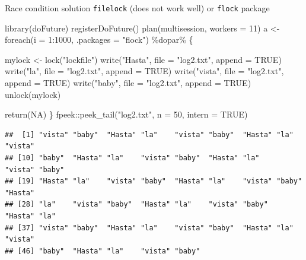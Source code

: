 \documentclass[
  ignorenonframetext,
  usenames,
  dvipsnames]{beamer}
\newenvironment{Shaded}{\begin{snugshade}}{\end{snugshade}}
\newcommand{\AttributeTok}[1]{\textcolor[rgb]{0.77,0.63,0.00}{#1}}
\newcommand{\ConstantTok}[1]{\textcolor[rgb]{0.00,0.00,0.00}{#1}}
\newcommand{\DecValTok}[1]{\textcolor[rgb]{0.00,0.00,0.81}{#1}}
\newcommand{\FunctionTok}[1]{\textcolor[rgb]{0.00,0.00,0.00}{#1}}
\newcommand{\NormalTok}[1]{#1}
\newcommand{\OtherTok}[1]{\textcolor[rgb]{0.56,0.35,0.01}{#1}}
\newcommand{\SpecialCharTok}[1]{\textcolor[rgb]{0.00,0.00,0.00}{#1}}
\newcommand{\StringTok}[1]{\textcolor[rgb]{0.31,0.60,0.02}{#1}}
\begin{document}
\begin{frame}[fragile]{Race condition solution}
\protect\hypertarget{race-condition-solution}{}
\texttt{filelock} (does not work well) or \texttt{flock} package

\tiny

\begin{Shaded}
\begin{Highlighting}[]
\FunctionTok{library}\NormalTok{(doFuture)}
\FunctionTok{registerDoFuture}\NormalTok{()}
\FunctionTok{plan}\NormalTok{(multisession, }\AttributeTok{workers =} \DecValTok{11}\NormalTok{)}
\NormalTok{a }\OtherTok{\textless{}{-}} \FunctionTok{foreach}\NormalTok{(}\AttributeTok{i =} \DecValTok{1}\SpecialCharTok{:}\DecValTok{1000}\NormalTok{, }\AttributeTok{.packages =} \StringTok{"flock"}\NormalTok{) }\SpecialCharTok{\%dopar\%}\NormalTok{ \{}
  
\NormalTok{  mylock }\OtherTok{\textless{}{-}} \FunctionTok{lock}\NormalTok{(}\StringTok{"lockfile"}\NormalTok{)}
  \FunctionTok{write}\NormalTok{(}\StringTok{"Hasta"}\NormalTok{, }\AttributeTok{file =} \StringTok{"log2.txt"}\NormalTok{, }\AttributeTok{append =} \ConstantTok{TRUE}\NormalTok{)}
  \FunctionTok{write}\NormalTok{(}\StringTok{"la"}\NormalTok{, }\AttributeTok{file =} \StringTok{"log2.txt"}\NormalTok{, }\AttributeTok{append =} \ConstantTok{TRUE}\NormalTok{)}
  \FunctionTok{write}\NormalTok{(}\StringTok{"vista"}\NormalTok{, }\AttributeTok{file =} \StringTok{"log2.txt"}\NormalTok{, }\AttributeTok{append =} \ConstantTok{TRUE}\NormalTok{)}
  \FunctionTok{write}\NormalTok{(}\StringTok{"baby"}\NormalTok{, }\AttributeTok{file =} \StringTok{"log2.txt"}\NormalTok{, }\AttributeTok{append =} \ConstantTok{TRUE}\NormalTok{)}
  \FunctionTok{unlock}\NormalTok{(mylock)}
  
  \FunctionTok{return}\NormalTok{(}\ConstantTok{NA}\NormalTok{)}
\NormalTok{\}}
\NormalTok{fpeek}\SpecialCharTok{::}\FunctionTok{peek\_tail}\NormalTok{(}\StringTok{"log2.txt"}\NormalTok{, }\AttributeTok{n =} \DecValTok{50}\NormalTok{, }\AttributeTok{intern =} \ConstantTok{TRUE}\NormalTok{)}
\end{Highlighting}
\end{Shaded}

\begin{verbatim}
##  [1] "vista" "baby"  "Hasta" "la"    "vista" "baby"  "Hasta" "la"    "vista"
## [10] "baby"  "Hasta" "la"    "vista" "baby"  "Hasta" "la"    "vista" "baby" 
## [19] "Hasta" "la"    "vista" "baby"  "Hasta" "la"    "vista" "baby"  "Hasta"
## [28] "la"    "vista" "baby"  "Hasta" "la"    "vista" "baby"  "Hasta" "la"   
## [37] "vista" "baby"  "Hasta" "la"    "vista" "baby"  "Hasta" "la"    "vista"
## [46] "baby"  "Hasta" "la"    "vista" "baby"
\end{verbatim}

\normalsize
\end{frame}
\end{document}
